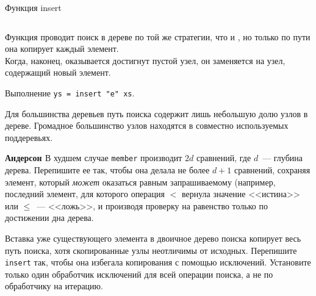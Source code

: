 \begin{frame}[fragile]{Функция insert}
\inputminted[firstline=27, lastline=31] {haskell}{code/SearchTree.hs}

Функция  проводит поиск в дереве по той же стратегии,
что и , но только по пути она копирует каждый
элемент. \\

Когда, наконец, оказывается достигнут пустой узел, он
заменяется на узел, содержащий новый элемент.
 
\end{frame}

\begin{frame}[fragile]{}
\begin{minipage}{.48\textwidth}
		\par
\end{minipage}
\begin{minipage}{.48\textwidth}
	
\end{minipage}
Выполнение \texttt{ys = insert "e" xs}. 

Для большинства деревьев путь
поиска содержит лишь небольшую долю узлов в дереве. Громадное
большинство узлов находятся в совместно используемых поддеревьях.
\end{frame}

\begin{frame}
\begin{exercise}\textbf{Андерсон \cite{Andersson1991}}\label{ex:2.2}
  В худшем случае \lstinline{member} производит $2d$ сравнений, где
  $d$~--- глубина дерева. Перепишите ее так, чтобы она делала не более
  $d+1$ сравнений, сохраняя элемент, который \emph{может} оказаться
  равным запрашиваемому (например, последний элемент, для которого
  операция $<$ вернула значение <<истина>> или $\le$~--- <<ложь>>, и
  производя проверку на равенство только по достижении дна дерева.
\end{exercise}

\begin{exercise}\label{ex:2.3}
  Вставка уже существующего элемента в двоичное дерево поиска копирует
  весь путь поиска, хотя скопированные узлы неотличимы от
  исходных. Перепишите \lstinline{insert} так, чтобы она избегала
  копирования с помощью исключений. Установите только один обработчик
  исключений для всей операции поиска, а не по обработчику на итерацию.
\end{exercise}
\end{frame}

